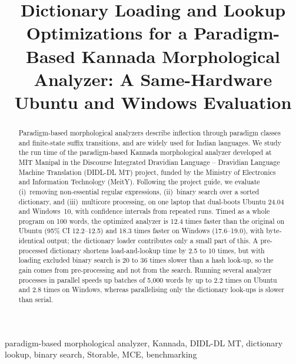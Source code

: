 \documentclass[conference]{IEEEtran}
\begin{document}
\title{Dictionary Loading and Lookup Optimizations for a Paradigm-Based Kannada Morphological Analyzer: A Same-Hardware Ubuntu and Windows Evaluation}

\author{
\and
{}
}

\maketitle

\begin{abstract}
Paradigm-based morphological analyzers describe inflection through paradigm classes and finite-state suffix transitions, and are widely used for Indian languages. We study the run time of the paradigm-based Kannada morphological analyzer developed at MIT Manipal in the Discourse Integrated Dravidian Language -- Dravidian Language Machine Translation (DIDL-DL MT) project, funded by the Ministry of Electronics and Information Technology (MeitY). Following the project guide, we evaluate (i)~removing non-essential regular expressions, (ii)~binary search over a sorted dictionary, and (iii)~multicore processing, on one laptop that dual-boots Ubuntu 24.04 and Windows~10, with confidence intervals from repeated runs. Timed as a whole program on 100 words, the optimized analyzer is 12.4 times faster than the original on Ubuntu (95\% CI 12.2--12.5) and 18.3 times faster on Windows (17.6--19.0), with byte-identical output; the dictionary loader contributes only a small part of this. A pre-processed dictionary shortens load-and-lookup time by 2.5 to 10 times, but with loading excluded binary search is 20 to 36 times slower than a hash look-up, so the gain comes from pre-processing and not from the search. Running several analyzer processes in parallel speeds up batches of 5,000 words by up to 2.2 times on Ubuntu and 2.8 times on Windows, whereas parallelising only the dictionary look-ups is slower than serial.
\end{abstract}

\begin{IEEEkeywords}
paradigm-based morphological analyzer, Kannada, DIDL-DL MT, dictionary lookup, binary search, Storable, MCE, benchmarking
\end{IEEEkeywords}
\end{document}
